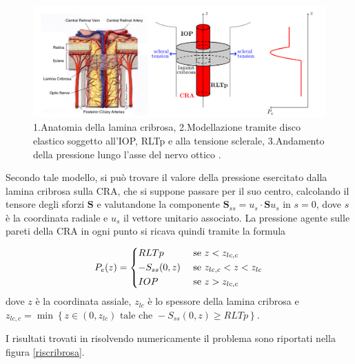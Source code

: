 \documentclass{article}
\begin{document}
\begin{figure}[h]
\begin{center}
\includegraphics[width=1.0\textwidth]{Pictures/laminacribrosa.png}
\caption{1.Anatomia della lamina cribrosa, 2.Modellazione tramite disco elastico soggetto all'IOP, RLTp e alla tensione sclerale, 3.Andamento della pressione lungo l'asse del nervo ottico \cite{art3}.}
\label{laminacribrosa}
\end{center}
\end{figure}

Secondo tale modello, si può trovare il valore della pressione esercitato dalla lamina cribrosa sulla CRA, che si suppone passare per il suo centro, calcolando il tensore degli sforzi $\mathbf{S}$ e valutandone la componente $\mathbf{S}_{ss} = u_s \cdot \mathbf{S} u_s$ in $s = 0$, dove $s$ è la coordinata radiale e $u_s$ il vettore unitario associato.
La pressione agente sulle pareti della CRA in ogni punto si ricava quindi tramite la formula

\begin{equation}
P_e(z) = \begin{dcases}
RLTp & \mbox{  se  }  z < z_{lc,c}\\ 
-S_{ss}(0,z) & \mbox{  se  }  z_{lc,c} < z < z_{lc}\\ 
IOP & \mbox{  se  }  z > z_{lc,c}
\end{dcases}
\label{cribrosa_alt}
\end{equation}
dove $z$ è la coordinata assiale, $z_{lc}$ è lo spessore della lamina cribrosa e $z_{lc,c} = \min\left\lbrace z \in \left(0,z_{lc}\right) \mbox{   tale che  } -S_{ss}(0,z) \geq RLTp\right\rbrace$.

I risultati trovati in \cite{art3} risolvendo numericamente il problema sono riportati nella figura \ref{riscribrosa}.
\end{document}
